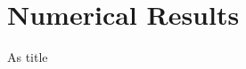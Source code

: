 \documentclass[Thesis.tex]{subfiles}
\begin{document}
\setcounter{section}{2}

\section{Numerical Results}

As title    
\end{document}
